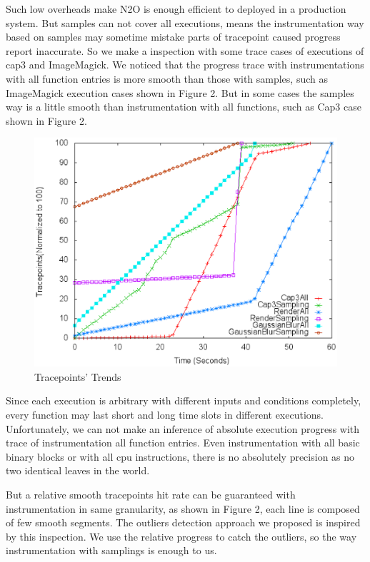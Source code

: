 Such low overheads make N2O is enough efficient to deployed in a production system. But samples can not cover all executions, means the instrumentation way based on samples may sometime mistake parts of tracepoint caused progress report inaccurate. So we make a inspection with some trace cases of executions of cap3 and ImageMagick. We noticed that the progress trace with instrumentations with all function entries is more smooth than those with samples, such as ImageMagick execution cases shown in Figure 2. But in some cases the samples way is a little smooth than instrumentation with all functions, such as Cap3 case shown in Figure 2.

\begin{figure}
\centering
\includegraphics[width=0.9\columnwidth]{figures/tracepoints_all_vs_sampling.eps}
\caption{Tracepoints' Trends}
\label{figure:tracepoints}
\end{figure}

Since each execution is arbitrary with different inputs and conditions completely, every function may last short and long time slots in different executions. Unfortunately, we can not make an inference of absolute execution progress with  trace of instrumentation all function entries. Even instrumentation with all basic binary blocks or with all cpu instructions, there is no absolutely precision as no two identical leaves in the world. 

But a relative smooth tracepoints hit rate can be guaranteed with instrumentation in same granularity, as shown in Figure 2, each line is composed  of few smooth segments. The outliers detection approach we proposed is inspired by this inspection. We use the relative progress to catch the outliers, so the way instrumentation with samplings is enough to us.

